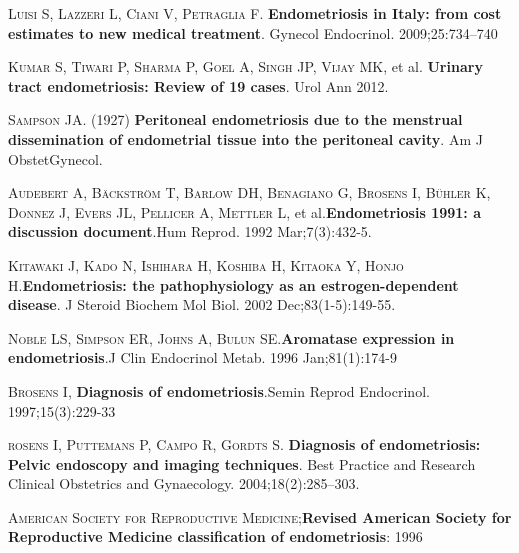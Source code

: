 \documentclass[12pt]{article} %
\begin{document}
\textsc{Luisi S, Lazzeri L, Ciani V, Petraglia F}.\textbf{ Endometriosis in Italy: from cost estimates to new medical treatment}. Gynecol Endocrinol. 2009;25:734–740

\vspace{0,5cm}

\textsc{Kumar S, Tiwari P, Sharma P, Goel A, Singh JP, Vijay MK}, et al.\textbf{ Urinary tract endometriosis: Review of 19 cases}. Urol Ann 2012.

\vspace{0,5cm}

\textsc{Sampson JA}. (1927) \textbf{Peritoneal endometriosis due to the
menstrual dissemination of endometrial tissue into the
peritoneal cavity}. Am J ObstetGynecol.

\vspace{0,5cm}


\textsc{Audebert A, Bäckström T, Barlow DH, Benagiano G, Brosens I, Bühler K, Donnez J, Evers JL, Pellicer A, Mettler L}, et al.\textbf{Endometriosis 1991: a discussion document}.Hum Reprod. 1992 Mar;7(3):432-5.

\vspace{0,5cm}

\textsc{Kitawaki J, Kado N, Ishihara H, Koshiba H, Kitaoka Y, Honjo H}.\textbf{Endometriosis: the pathophysiology as an estrogen-dependent disease}. J Steroid Biochem Mol Biol. 2002 Dec;83(1-5):149-55.

\vspace{0,5cm}

\textsc{Noble LS, Simpson ER, Johns A, Bulun SE}.\textbf{Aromatase expression in endometriosis}.J Clin Endocrinol Metab. 1996 Jan;81(1):174-9

\vspace{0,5cm}

\textsc{Brosens I}, \textbf{Diagnosis of endometriosis}.Semin Reprod Endocrinol. 1997;15(3):229-33

\vspace{0,5cm}

\textsc{rosens I, Puttemans P, Campo R, Gordts S}. \textbf{Diagnosis of endometriosis: Pelvic endoscopy and imaging techniques}. Best Practice and Research Clinical Obstetrics and Gynaecology. 2004;18(2):285–303.

\vspace{0,5cm}

\textsc{American Society for Reproductive Medicine};\textbf{Revised American Society for Reproductive Medicine classification of endometriosis}: 1996
\end{document}
